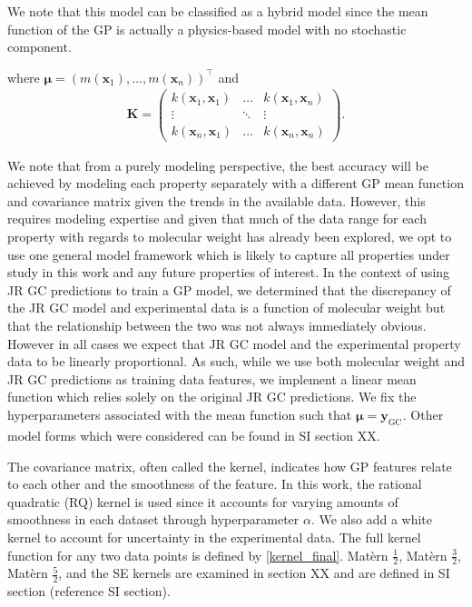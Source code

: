 \documentclass[journal=jacsat,manuscript=article]{achemso}
\newcommand{\xvec}{\ensuremath{\mathbf{x}}}
\newcommand{\Ygcvec}[1][]{\ensuremath{\mathbf{y}_{\text{GC}_{#1}}}}
\begin{document}
We note that this model can be classified as a hybrid model \cite{koh} since the mean function of the GP is actually a physics-based model with no stochastic component. 

\noindent where $\boldsymbol{\mu} = (m(\xvec_1), \dots, m(\xvec_n))^\intercal$ and
\begin{gather}
    \mathbf{K}= 
    \left(
    \begin{matrix}
        k(\xvec_1,\xvec_1) & \dots & k(\xvec_1,\xvec_n) \\
        \vdots & \ddots & \vdots \\
        k(\xvec_n,\xvec_1) & \dots & k(\xvec_n,\xvec_n)
    \end{matrix}\right).
\end{gather}

We note that from a purely modeling perspective, the best accuracy will be achieved by modeling each property separately with a different GP mean function and covariance matrix given the trends in the available data. However, this requires modeling expertise and given that much of the data range for each property with regards to molecular weight has already been explored, we opt to use one general model framework which is likely to capture all properties under study in this work and any future properties of interest. In the context of using JR GC predictions to train a GP model, we determined that the discrepancy of the JR GC model and experimental data is a function of molecular weight but that the relationship between the two was not always immediately obvious. However in all cases we expect that JR GC model and the experimental property data to be linearly proportional. As such, while we use both molecular weight and JR GC predictions as training data features, we implement a linear mean function which relies solely on the original JR GC predictions. We fix the hyperparameters associated with the mean function such that $\boldsymbol{\mu} = \Ygcvec$.  Other model forms which were considered can be found in SI section XX. 

The covariance matrix, often called the kernel, indicates how GP features relate to each other and the smoothness of the feature. In this work, the rational quadratic (RQ) kernel is used since it accounts for varying amounts of smoothness in each dataset through hyperparameter $\alpha$. We also add a white kernel to account for uncertainty in the experimental data. The full kernel function for any two data points is defined by \eqref{kernel_final}. Mat\`ern $\frac{1}{2}$, Mat\`ern $\frac{3}{2}$, Mat\`ern $\frac{5}{2}$, and the SE kernels are examined in section XX and are defined in SI section (reference SI section).
\end{document}

